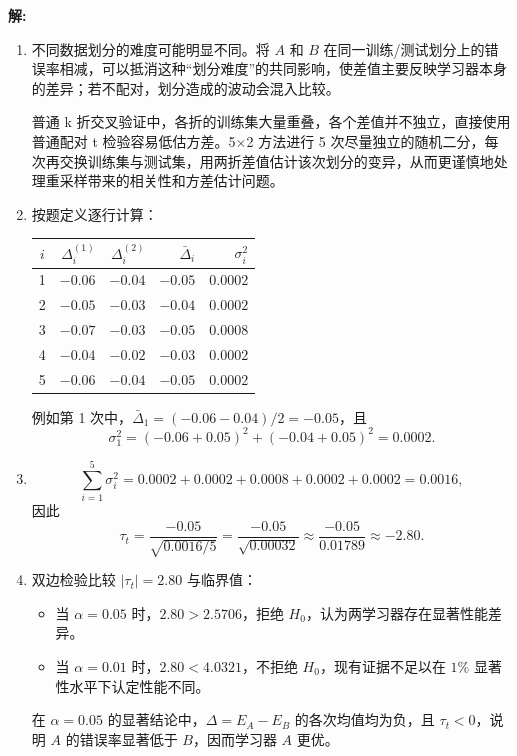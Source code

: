 \documentclass[8pt]{article}
\newcommand{\ans}{\par\noindent\textbf{\large 解:}\par}
\begin{document}
\ans
\begin{enumerate}[leftmargin=2.2em,itemsep=0.9em]
\item 不同数据划分的难度可能明显不同。将 $A$ 和 $B$ 在同一训练/测试划分上的错误率相减，可以抵消这种“划分难度”的共同影响，使差值主要反映学习器本身的差异；若不配对，划分造成的波动会混入比较。

普通 k 折交叉验证中，各折的训练集大量重叠，各个差值并不独立，直接使用普通配对 t 检验容易低估方差。5$\times$2 方法进行 5 次尽量独立的随机二分，每次再交换训练集与测试集，用两折差值估计该次划分的变异，从而更谨慎地处理重采样带来的相关性和方差估计问题。

\item 按题定义逐行计算：
\begin{center}
\begin{tabular}{c@{\qquad}rrrr}
\toprule
$i$ & $\Delta_i^{(1)}$ & $\Delta_i^{(2)}$ & $\bar{\Delta}_i$ & $\sigma_i^2$\\
\midrule
1&$-0.06$&$-0.04$&$-0.05$&$0.0002$\\
2&$-0.05$&$-0.03$&$-0.04$&$0.0002$\\
3&$-0.07$&$-0.03$&$-0.05$&$0.0008$\\
4&$-0.04$&$-0.02$&$-0.03$&$0.0002$\\
5&$-0.06$&$-0.04$&$-0.05$&$0.0002$\\
\bottomrule
\end{tabular}
\end{center}
例如第 1 次中，$\bar{\Delta}_1=(-0.06-0.04)/2=-0.05$，且
\[
\sigma_1^2=(-0.06+0.05)^2+(-0.04+0.05)^2=0.0002.
\]

\item
\[
\sum_{i=1}^{5}\sigma_i^2=0.0002+0.0002+0.0008+0.0002+0.0002=0.0016,
\]
因此
\[
\tau_t=\frac{-0.05}{\sqrt{0.0016/5}}
=\frac{-0.05}{\sqrt{0.00032}}
\approx\frac{-0.05}{0.01789}
\approx-2.80.
\]

\item 双边检验比较 $|\tau_t|=2.80$ 与临界值：
\begin{itemize}[leftmargin=2em,itemsep=0.35em]
\item 当 $\alpha=0.05$ 时，$2.80>2.5706$，拒绝 $H_0$，认为两学习器存在显著性能差异。
\item 当 $\alpha=0.01$ 时，$2.80<4.0321$，不拒绝 $H_0$，现有证据不足以在 $1\%$ 显著性水平下认定性能不同。
\end{itemize}
在 $\alpha=0.05$ 的显著结论中，$\Delta=E_A-E_B$ 的各次均值均为负，且 $\tau_t<0$，说明 $A$ 的错误率显著低于 $B$，因而学习器 $A$ 更优。
\end{enumerate}
\end{document}
